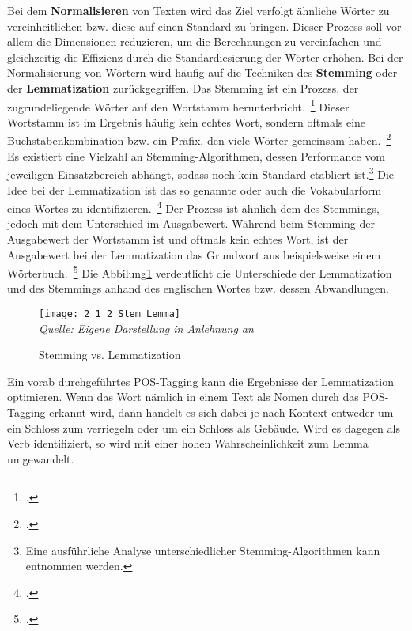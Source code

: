 Bei dem \textbf{Normalisieren} von Texten wird das Ziel verfolgt ähnliche Wörter zu vereinheitlichen bzw.
diese auf einen Standard zu bringen.
Dieser Prozess soll vor allem die Dimensionen reduzieren, um die Berechnungen zu vereinfachen und gleichzeitig die
Effizienz durch die Standardiesierung der Wörter erhöhen.
\newline
Bei der Normalisierung von Wörtern wird häufig auf die Techniken des \textbf{Stemming} oder der \textbf{Lemmatization}
zurückgegriffen.
Das Stemming ist ein Prozess, der zugrundeliegende Wörter auf den Wortstamm herunterbricht.~\footcite[\vglf][]
{khyani.2021}
Dieser Wortstamm ist im Ergebnis häufig kein echtes Wort, sondern oftmals eine Buchstabenkombination bzw.
ein Präfix, den viele Wörter gemeinsam haben.~\footcite[\vglf][]{khyani.2021}
Es existiert eine Vielzahl an Stemming-Algorithmen, dessen Performance vom jeweiligen Einsatzbereich abhängt, sodass
noch kein Standard etabliert ist.\footnote{Eine ausführliche Analyse unterschiedlicher Stemming-Algorithmen kann{}
\cite{jivani.2011} entnommen werden.}
\newline
Die Idee bei der Lemmatization ist das so genannte \grqq{} oder auch die Vokabularform eines Wortes
zu identifizieren.~\footcite[\vglf][]{khyani.2021}
Der Prozess ist ähnlich dem des Stemmings, jedoch mit dem Unterschied im Ausgabewert.
Während beim Stemming der Ausgabewert der Wortstamm ist und oftmals kein echtes Wort,
ist der Ausgabewert bei der Lemmatization das Grundwort aus beispielsweise einem Wörterbuch.~\footcite[\vglf]
[]{khyani.2021}
Die Abbilung{}\ref{fig:2_1_2_Stem_Lemma} verdeutlicht die Unterschiede der Lemmatization und des Stemmings anhand
des englischen Wortes \grqq{} bzw.
dessen Abwandlungen.

\begin{figure}[H]
    \caption{Stemming vs. Lemmatization}\label{fig:2_1_2_Stem_Lemma}
    \texttt{[image: 2\_1\_2\_Stem\_Lemma]}
    \\
    \textit{Quelle: Eigene Darstellung in Anlehnung an}~\cite[]{khyani.2021}
\end{figure}
Ein vorab durchgeführtes \ac{POS}-Tagging kann die Ergebnisse der Lemmatization optimieren.
Wenn das Wort \grqq{} nämlich in einem Text als Nomen durch das \ac{POS}-Tagging erkannt wird,
dann handelt es sich dabei je nach Kontext entweder um ein Schloss zum verriegeln oder um ein Schloss als Gebäude.
Wird es dagegen als Verb identifiziert, so wird mit einer hohen Wahrscheinlichkeit zum Lemma \qrqq{}
umgewandelt.

